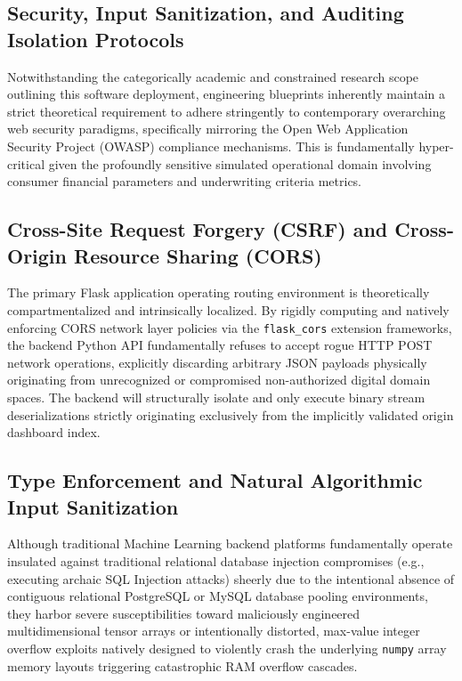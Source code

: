 \hypertarget{security-input-sanitization-and-auditing-isolation-protocols}{%
\subsection{Security, Input Sanitization, and Auditing Isolation
Protocols}\label{security-input-sanitization-and-auditing-isolation-protocols}}

Notwithstanding the categorically academic and constrained research
scope outlining this software deployment, engineering blueprints
inherently maintain a strict theoretical requirement to adhere
stringently to contemporary overarching web security paradigms,
specifically mirroring the Open Web Application Security Project (OWASP)
compliance mechanisms. This is fundamentally hyper-critical given the
profoundly sensitive simulated operational domain involving consumer
financial parameters and underwriting criteria metrics.

\hypertarget{cross-site-request-forgery-csrf-and-cross-origin-resource-sharing-cors}{%
\subsection{Cross-Site Request Forgery (CSRF) and Cross-Origin Resource
Sharing
(CORS)}\label{cross-site-request-forgery-csrf-and-cross-origin-resource-sharing-cors}}

The primary Flask application operating routing environment is
theoretically compartmentalized and intrinsically localized. By rigidly
computing and natively enforcing CORS network layer policies via the
\texttt{flask\_cors} extension frameworks, the backend Python API
fundamentally refuses to accept rogue HTTP POST network operations,
explicitly discarding arbitrary JSON payloads physically originating
from unrecognized or compromised non-authorized digital domain spaces.
The backend will structurally isolate and only execute binary stream
deserializations strictly originating exclusively from the implicitly
validated origin dashboard index.

\hypertarget{type-enforcement-and-natural-algorithmic-input-sanitization}{%
\subsection{Type Enforcement and Natural Algorithmic Input
Sanitization}\label{type-enforcement-and-natural-algorithmic-input-sanitization}}

Although traditional Machine Learning backend platforms fundamentally
operate insulated against traditional relational database injection
compromises (e.g., executing archaic SQL Injection attacks) sheerly due
to the intentional absence of contiguous relational PostgreSQL or MySQL
database pooling environments, they harbor severe susceptibilities
toward maliciously engineered multidimensional tensor arrays or
intentionally distorted, max-value integer overflow exploits natively
designed to violently crash the underlying \texttt{numpy} array memory
layouts triggering catastrophic RAM overflow cascades.


